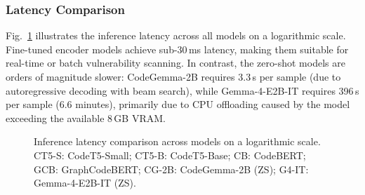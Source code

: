 \documentclass[conference]{IEEEtran}
\begin{document}
\subsubsection{Latency Comparison}
Fig.~\ref{fig:latency_comparison} illustrates the inference latency across
all models on a logarithmic scale.  Fine-tuned encoder models achieve sub-30\,ms latency, making
them suitable for real-time or batch vulnerability scanning.  In contrast,
the zero-shot models are orders of magnitude slower: CodeGemma-2B requires
3.3\,s per sample (due to autoregressive decoding with beam search), while
Gemma-4-E2B-IT requires 396\,s per sample (6.6 minutes), primarily due to
CPU offloading caused by the model exceeding the available 8\,GB VRAM.

\begin{figure}[!t]
\centering
{}
\caption{Inference latency comparison across models on a logarithmic scale. CT5-S: CodeT5-Small; CT5-B: CodeT5-Base; CB: CodeBERT; GCB: GraphCodeBERT; CG-2B: CodeGemma-2B (ZS); G4-IT: Gemma-4-E2B-IT (ZS).}
\label{fig:latency_comparison}
\end{figure}
\end{document}
